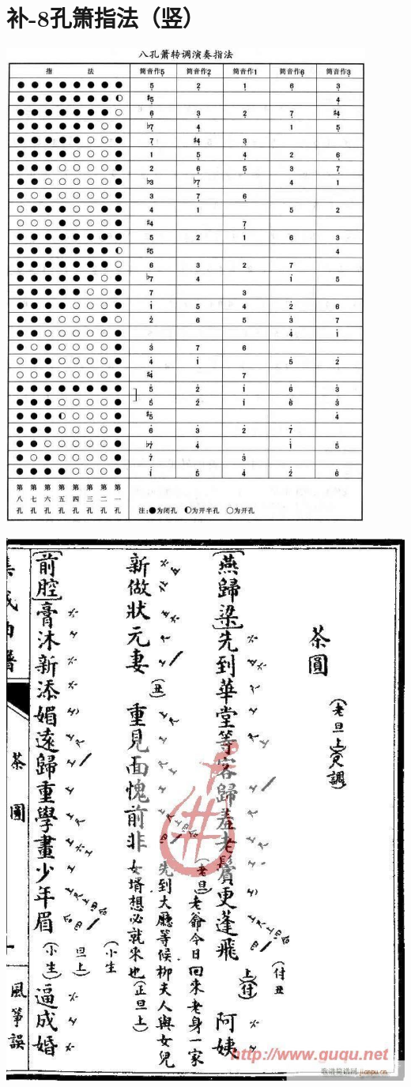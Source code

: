 \documentclass[cn,pad,twocol]{elegantbook}
\begin{document}
\section{补-8孔箫指法（竖）}
    \includegraphics[width=0.9\textwidth]{dongxiao/20200817-8孔箫指法-竖}

\newpage
\pagestyle{empty}
\includegraphics[width=\textwidth]{cover99}
\end{document}
